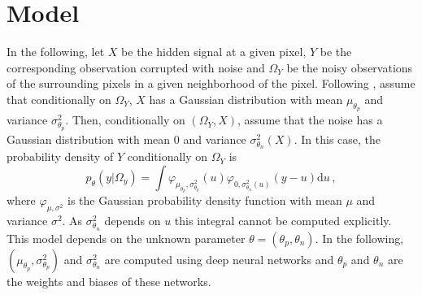\documentclass[review]{cvpr}
\begin{document}
\section{Model}
\label{sec:model}
In the following, let $X$ be the hidden signal at a given pixel, $Y$ be the corresponding observation corrupted with noise and $\Omega_Y$ be the noisy observations of the surrounding pixels in a given neighborhood of the pixel. Following \cite{laine2019high}, assume that conditionally on $\Omega_Y$, $X$ has a Gaussian distribution with mean $\mu_{\theta_p}$ and variance $\sigma_{\theta_p}^2$. Then, conditionally on $(\Omega_Y,X)$, assume that the noise has a Gaussian distribution with mean $0$ and variance $\sigma_{\theta_n}^2(X)$. In this case, the probability density of $Y$ conditionally on $\Omega_Y$ is
$$
p_{\theta}(y|\Omega_y) = \int \varphi_{\mu_{\theta_p},\sigma_{\theta_p}^2}(u)\varphi_{0,\sigma_{\theta_n}^2(u)}(y-u)\mathrm{d}u\,,
$$
where $\varphi_{\mu,\sigma^2}$ is the Gaussian probability density function with mean $\mu$ and variance $\sigma^2$.
As $\sigma_{\theta_n}^2$ depends on $u$ this integral cannot be computed explicitly. This model depends on the unknown parameter $\theta = (\theta_p,\theta_n)$. In the following, $(\mu_{\theta_p},\sigma^2_{\theta_p})$ and $\sigma^2_{\theta_n}$ are computed using deep neural networks and $\theta_p$ and $\theta_n$ are the weights and biases of these networks.
\end{document}
